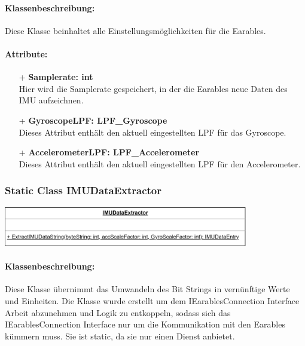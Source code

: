 \documentclass[a4paper,12pt]{article}
\begin{document}
\paragraph{Klassenbeschreibung:}
Diese Klasse beinhaltet alle Einstellungsmöglichkeiten für die \Gls{Earables}.

\paragraph{Attribute:}
\begin{itemize}
	\item[+] \textbf{Samplerate: int}\\Hier wird die Samplerate gespeichert, in der die \Gls{Earables} neue Daten des IMU aufzeichnen.
	\item[+] \textbf{GyroscopeLPF: LPF\_Gyroscope}\\Dieses Attribut enthält den aktuell eingestellten LPF für das Gyroscope.
	\item[+] \textbf{AccelerometerLPF: LPF\_Accelerometer}\\Dieses Attribut enthält den aktuell eingestellten LPF für den Accelerometer.
\end{itemize}

\begin{minipage}[b]{0.5\textwidth}
	\subsubsection{Static Class IMUDataExtractor}
	\end{minipage}
	\begin{minipage}[c]{0.5\textwidth}
	\includegraphics[width=0.8\textwidth]{bilder/BibPackageKlassen/IMUDataExtractor.png}
\end{minipage}
\paragraph{Klassenbeschreibung:}
Diese Klasse übernimmt das Umwandeln des Bit Strings in vernünftige Werte und Einheiten.
Die Klasse wurde erstellt um dem IEarablesConnection Interface Arbeit abzunehmen und Logik zu entkoppeln, sodass sich das IEarablesConnection
Interface nur um die Kommunikation mit den \Gls{Earables} kümmern muss. Sie ist static, da sie nur einen Dienst anbietet.
\end{document}
